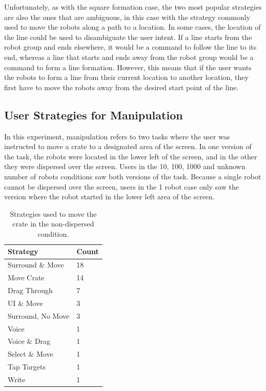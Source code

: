 Unfortunately, as with the square formation case, the two most popular strategies are also the ones that are ambiguous, in this case with the strategy commonly used to move the robots along a path to a location. 
In some cases, the location of the line could be used to disambiguate the user intent. 
If a line starts from the robot group and ends elsewhere, it would be a command to follow the line to its end, whereas a line that starts and ends away from the robot group would be a command to form a line formation. 
However, this means that if the user wants the robots to form a line from their current location to another location, they first have to move the robots away from the desired start point of the line. 

\subsection{User Strategies for Manipulation}

In this experiment, manipulation refers to two tasks where the user was instructed to move a crate to a designated area of the screen. 
In one version of the task, the robots were located in the lower left of the screen, and in the other they were dispersed over the screen. 
Users in the 10, 100, 1000 and unknown number of robots conditions saw both versions of the task. 
Because a single robot cannot be dispersed over the screen, users in the 1 robot case only saw the version where the robot started in the lower left area of the screen. 

\begin{table}
	\begin{tabular}{l l}
		Strategy & Count\\
		\hline
		Surround \& Move & 18\\
		Move Crate & 14\\
		Drag Through & 7\\
		UI \& Move & 3\\
		Surround, No Move & 3\\
		Voice & 1\\
		Voice \& Drag & 1\\
		Select \& Move & 1 \\
		Tap Targets & 1\\
		Write & 1\\
	\end{tabular}
	\caption{Strategies used to move the crate in the non-dispersed condition.}
	\label{tab:crate_strategies}
\end{table}

